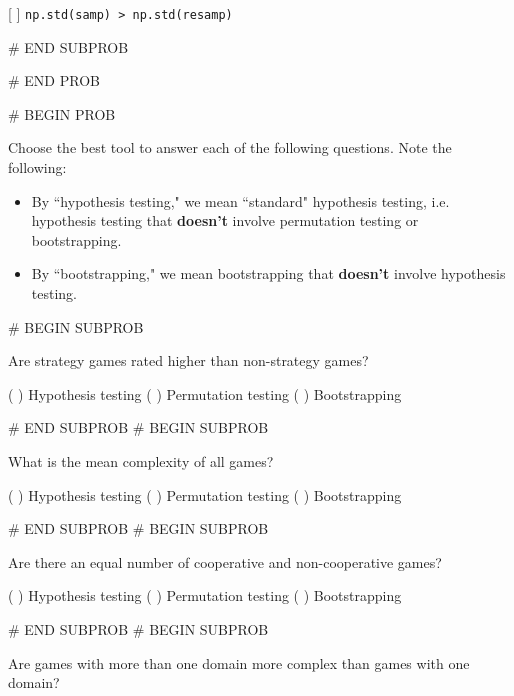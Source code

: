 \documentclass[twoside,12pt]{article}
\begin{document}
{            [ ] \texttt{np.std(samp) > np.std(resamp)}
   
    

# END SUBPROB




# END PROB

\newpage
# BEGIN PROB



Choose the best tool to answer each of the following questions. Note the following:
\begin{itemize}
    \item By ``hypothesis testing," we mean ``standard" hypothesis testing, i.e. hypothesis testing that \textbf{doesn't} involve permutation testing or bootstrapping.
    \item By ``bootstrapping," we mean bootstrapping that \textbf{doesn't} involve hypothesis testing.
\end{itemize}


    # BEGIN SUBPROB


        Are strategy games rated higher than non-strategy games?

        \begin{center}
            ( ) Hypothesis testing
            ( ) Permutation testing
            ( ) Bootstrapping           
        \end{center}

    

# END SUBPROB
    # BEGIN SUBPROB


        What is the mean complexity of all games?

        \begin{center}
            ( ) Hypothesis testing
            ( ) Permutation testing
            ( ) Bootstrapping           
        \end{center}
        
    

# END SUBPROB
    # BEGIN SUBPROB


        Are there an equal number of cooperative and non-cooperative games?

        \begin{center}
            ( ) Hypothesis testing
            ( ) Permutation testing
            ( ) Bootstrapping           
        \end{center}
        
    

# END SUBPROB
    # BEGIN SUBPROB


        Are games with more than one domain more complex than games with one domain?

}
\end{document}
